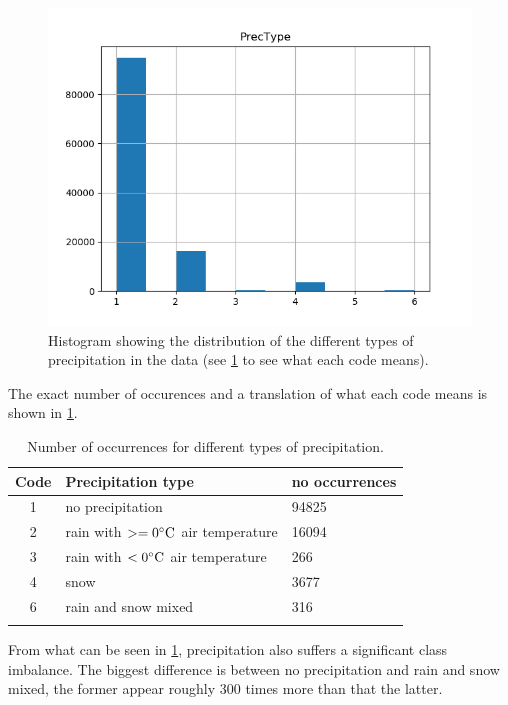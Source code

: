 	\begin{figure}[H] 
	\centering
	\includegraphics[width=1\textwidth]{media/histogram_prectype.png}
	\caption{Histogram showing the distribution of the different types of precipitation in the data (see \ref{table:occurences_prectype} to see what each code means).}
	\label{img:correlations_featureengi}
	\end{figure}

	The exact number of occurences and a translation of what each code means is shown in \ref{table:occurences_prectype}.

	\begin{table}[H]
	\centering
	\caption{Number of occurrences for different types of precipitation. }
		\begin{tabular}[3]{c | l | l}
    			Code & Precipitation type & no occurrences \\
    			\hline
			1 & no precipitation & 94825 \\
			2 & rain with $>= 0 \celsius$ air temperature & 16094 \\
			3 & rain with $< 0 \celsius$ air temperature & 266 \\
			4 & snow & 3677 \\
			6 & rain and snow mixed & 316 \\
			\label{table:occurences_prectype}
		\end{tabular}
	\end{table}

	From what can be seen in \ref{table:occurences_prectype}, precipitation also suffers a significant class imbalance. The biggest difference is between no precipitation and rain and snow mixed, the former appear roughly 300 times more than that the latter.

